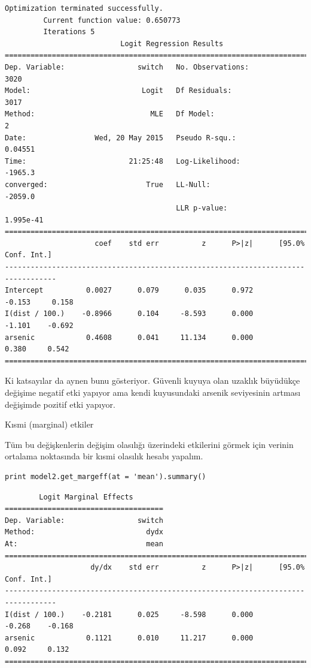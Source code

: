 \documentclass[12pt,fleqn]{article}\usepackage{../../common}
\begin{document}
\begin{verbatim}
Optimization terminated successfully.
         Current function value: 0.650773
         Iterations 5
                           Logit Regression Results                           
==============================================================================
Dep. Variable:                 switch   No. Observations:                 3020
Model:                          Logit   Df Residuals:                     3017
Method:                           MLE   Df Model:                            2
Date:                Wed, 20 May 2015   Pseudo R-squ.:                 0.04551
Time:                        21:25:48   Log-Likelihood:                -1965.3
converged:                       True   LL-Null:                       -2059.0
                                        LLR p-value:                 1.995e-41
==================================================================================
                     coef    std err          z      P>|z|      [95.0% Conf. Int.]
----------------------------------------------------------------------------------
Intercept          0.0027      0.079      0.035      0.972        -0.153     0.158
I(dist / 100.)    -0.8966      0.104     -8.593      0.000        -1.101    -0.692
arsenic            0.4608      0.041     11.134      0.000         0.380     0.542
==================================================================================
\end{verbatim}

Ki katsayılar da aynen bunu gösteriyor. Güvenli kuyuya olan uzaklık büyüdükçe
değişime negatif etki yapıyor ama kendi kuyusundaki arsenik seviyesinin artması
değişimde pozitif etki yapıyor.

Kısmi (marginal) etkiler

Tüm bu değişkenlerin değişim olasılığı üzerindeki etkilerini görmek için verinin
ortalama noktasında bir kısmi olasılık hesabı yapalım.

\begin{verbatim}
print model2.get_margeff(at = 'mean').summary()
\end{verbatim}

\begin{verbatim}
        Logit Marginal Effects       
=====================================
Dep. Variable:                 switch
Method:                          dydx
At:                              mean
==================================================================================
                    dy/dx    std err          z      P>|z|      [95.0% Conf. Int.]
----------------------------------------------------------------------------------
I(dist / 100.)    -0.2181      0.025     -8.598      0.000        -0.268    -0.168
arsenic            0.1121      0.010     11.217      0.000         0.092     0.132
==================================================================================
\end{verbatim}
\end{document}
